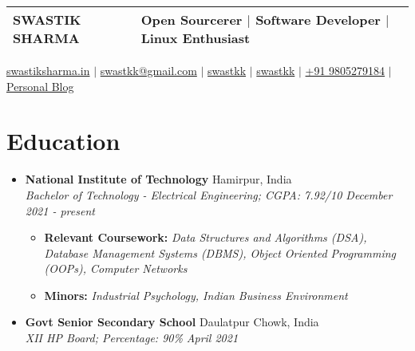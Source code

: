 \documentclass[legalpaper,10.8pt]{article}
\begin{document}
\pagestyle{empty} 


\begin{tabularx}{\linewidth}{@{} l X @{}}
\Huge {SWASTIK SHARMA} & \small{Open Sourcerer $|$ Software Developer $|$ Linux Enthusiast} \\[6pt]
\hline %
\end{tabularx}

\begin{flushleft}
\href{https://www.swastiksharma.in}{\raisebox{-0.05\height}{\faGlobe} swastiksharma.in} $|$ 
\href{mailto:swastkk@gmail.com}{\raisebox{-0.05\height}{\faEnvelope} swastkk@gmail.com} $|$ 
\href{https://github.com/swastkk}{\raisebox{-0.05\height}{\faGithub} swastkk} $|$ 
\href{https://linkedin.com/in/swastkk}{\raisebox{-0.05\height}{\faLinkedin} swastkk} $|$ 
\href{tel:+919805279184}{\raisebox{-0.05\height}{\faMobile} +91 9805279184} $|$ 
\href{https://blog.swastiksharma.in/}{\raisebox{-0.05\height}{\faPen} Personal Blog}
\end{flushleft}

\section{Education}
\begin{itemize}[leftmargin=*]
    \item \textbf{National Institute of Technology}  \hfill {Hamirpur, India}  \\
    \textit{{Bachelor of Technology - Electrical Engineering; CGPA: 7.92/10} \hfill {December 2021 - present}}
    \begin{itemize}[label=$\diamond$]
        \item \small \textbf{Relevant Coursework:} \textit{Data Structures and Algorithms (DSA), Database Management Systems (DBMS), Object Oriented Programming (OOPs),  Computer Networks}
         \item \small \textbf{Minors:} \textit{Industrial Psychology, Indian Business Environment}
    \end{itemize}
    \item \textbf{Govt Senior Secondary School} \hfill {Daulatpur Chowk, India} \\
    \textit{XII HP Board; Percentage: 90\%} \hfill \textit{April 2021}
\end{itemize}
\end{document}
